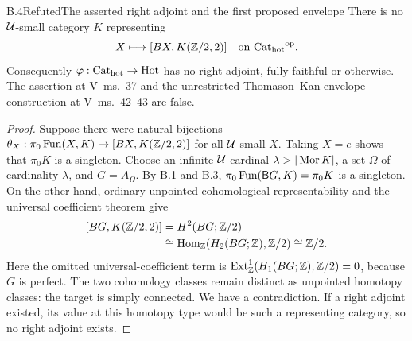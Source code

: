 \begin{claim}{B.4}{Refuted}{The asserted right adjoint and the first proposed envelope}
There is no $\mathcal U$-small category $K$ representing
\[
 X\longmapsto [BX,K(\mathbb Z/2,2)]
 \quad\text{on }{\mathrm{Cat}_{\mathrm{hot}}}^{\mathrm{op}}.
\]
Consequently $\varphi:{\mathrm{Cat}_{\mathrm{hot}}}\to\mathrm{Hot}$ has no right adjoint, fully
faithful or otherwise.  The assertion at V~ms.~37 and the unrestricted
Thomason--Kan-envelope construction at V~ms.~42--43 are false.
\end{claim}
\begin{proof}
Suppose there were natural bijections
$\theta_X:\pi_0\operatorname{Fun}(X,K)\to[BX,K(\mathbb Z/2,2)]$ for all $\mathcal U$-small $X$.
Taking $X=e$ shows that $\pi_0K$ is a singleton.  Choose an infinite
$\mathcal U$-cardinal $\lambda>|\operatorname{Mor} K|$, a set $\Omega$ of cardinality
$\lambda$, and $G=A_\Omega$.  By B.1 and B.3,
$\pi_0\operatorname{Fun}(\mathsf B G,K)=\pi_0K$ is a singleton.  On the other hand,
ordinary unpointed cohomological representability and the universal
coefficient theorem give
\[
\begin{split}
 [BG,K(\mathbb Z/2,2)]
 &=H^2(BG;\mathbb Z/2)\\
 &\cong\operatorname{Hom}_{\mathbb Z}(H_2(BG;\mathbb Z),\mathbb Z/2)
 \cong\mathbb Z/2.
\end{split}
\]
Here the omitted universal-coefficient term is
$\operatorname{Ext}^1_{\mathbb Z}(H_1(BG;\mathbb Z),\mathbb Z/2)=0$, because $G$ is perfect.
The two cohomology classes remain distinct as unpointed homotopy classes:
the target is simply connected.  We have a contradiction.  If a right
adjoint existed, its value at this homotopy type would be such a
representing category, so no right adjoint exists.
\end{proof}

